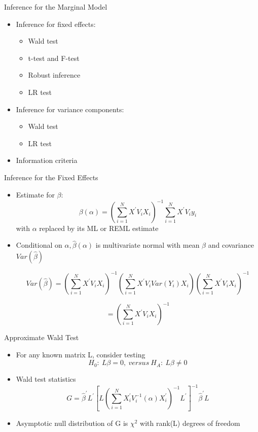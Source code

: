 \documentclass{beamer}
\begin{document}
\begin{frame}{Inference for the Marginal Model}
\begin{itemize}
 \item Inference for fixed effects:
	\begin{itemize}
		\item Wald test
		\item t-test and F-test
		\item Robust inference
		\item LR test
	\end{itemize}
\item Inference for variance components:
\begin{itemize}
	\item Wald test
	\item LR test
\end{itemize}
\item Information criteria
\end{itemize}
\end{frame}

\begin{frame}{Inference for the Fixed Effects}
\begin{itemize}
	\item Estimate for $\beta$:
	\[
	\beta(\alpha)=\left(\sum_{i=1}^{N}X^{'}V_iX_i\right)^{-1}\sum_{i=1}^{N}X^{'}V_iy_i
	\] with $\alpha$ replaced by its ML or REML estimate
	\item Conditional on $\alpha, \hat{\beta}(\alpha)$ is multivariate normal with mean $\beta$ and covariance $Var(\hat{\beta})$

	\[Var(\hat{\beta})=\left(\sum_{i=1}^{N}X^{'}V_iX_i\right)^{-1}
\left(\sum_{i=1}^{N}X^{'}V_iVar(Y_i)X_i\right) \left(\sum_{i=1}^{N}X^{'}V_iX_i\right)^{-1}\]

\[ =\left(\sum_{i=1}^{N}X^{'}V_iX_i\right)^{-1}\]
\end{itemize}
\end{frame}

\begin{frame}{Approximate Wald Test}
\begin{itemize}
	\item For any known matrix L, consider testing
	\[H_0:\:L\beta=0, \: versus \: H_A: \: L\beta \ne 0	\]
	\item Wald test statistics 
	\[G=\hat{\beta}^{'}L^{'} \left[L\left(\sum_{i=1}^{N}X^{'}_iV^{-1}_i(\alpha)X^{'}_i\right)^{-1}L^{'}\right]^{-1}\hat{\beta}^{'}L
	\]
	\item Asymptotic null distribution of G is $\chi^2$ with rank(L) degrees of freedom
\end{itemize}
\end{frame}
\end{document}
